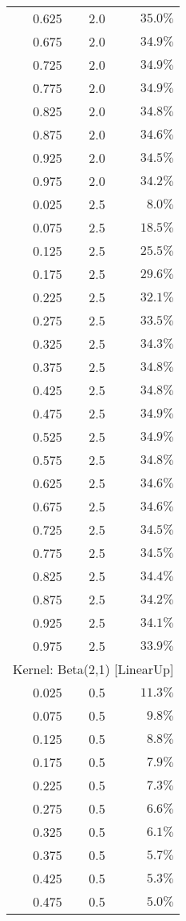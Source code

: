 \begin{longtable}{rrr}
0.625 & 2.0 & $35.0\%$ \\ 
0.675 & 2.0 & $34.9\%$ \\ 
0.725 & 2.0 & $34.9\%$ \\ 
0.775 & 2.0 & $34.9\%$ \\ 
0.825 & 2.0 & $34.8\%$ \\ 
0.875 & 2.0 & $34.6\%$ \\ 
0.925 & 2.0 & $34.5\%$ \\ 
0.975 & 2.0 & $34.2\%$ \\ 
0.025 & 2.5 & $8.0\%$ \\ 
0.075 & 2.5 & $18.5\%$ \\ 
0.125 & 2.5 & $25.5\%$ \\ 
0.175 & 2.5 & $29.6\%$ \\ 
0.225 & 2.5 & $32.1\%$ \\ 
0.275 & 2.5 & $33.5\%$ \\ 
0.325 & 2.5 & $34.3\%$ \\ 
0.375 & 2.5 & $34.8\%$ \\ 
0.425 & 2.5 & $34.8\%$ \\ 
0.475 & 2.5 & $34.9\%$ \\ 
0.525 & 2.5 & $34.9\%$ \\ 
0.575 & 2.5 & $34.8\%$ \\ 
0.625 & 2.5 & $34.6\%$ \\ 
0.675 & 2.5 & $34.6\%$ \\ 
0.725 & 2.5 & $34.5\%$ \\ 
0.775 & 2.5 & $34.5\%$ \\ 
0.825 & 2.5 & $34.4\%$ \\ 
0.875 & 2.5 & $34.2\%$ \\ 
0.925 & 2.5 & $34.1\%$ \\ 
0.975 & 2.5 & $33.9\%$ \\ 
\midrule
\multicolumn{3}{l}{Kernel: Beta(2,1) [LinearUp]} \\ 
\midrule
0.025 & 0.5 & $11.3\%$ \\ 
0.075 & 0.5 & $9.8\%$ \\ 
0.125 & 0.5 & $8.8\%$ \\ 
0.175 & 0.5 & $7.9\%$ \\ 
0.225 & 0.5 & $7.3\%$ \\ 
0.275 & 0.5 & $6.6\%$ \\ 
0.325 & 0.5 & $6.1\%$ \\ 
0.375 & 0.5 & $5.7\%$ \\ 
0.425 & 0.5 & $5.3\%$ \\ 
0.475 & 0.5 & $5.0\%$ \\ 

\end{longtable}
